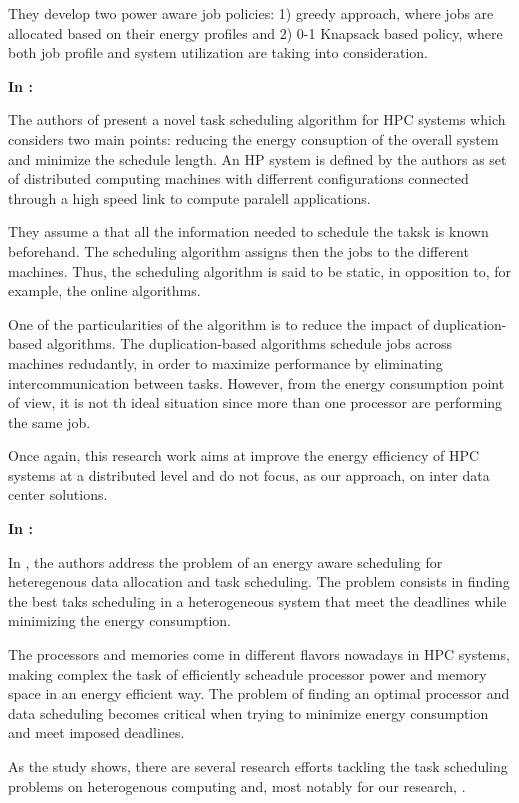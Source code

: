 They develop two power aware job policies: 1) greedy approach, where jobs are
allocated based on their energy profiles  and 2) 0-1 Knapsack based policy,
where both job profile and system utilization are taking into consideration.



\textbf{In \cite{SCHED_HETEROGE}:}

The authors of \cite{SCHED_HETEROGE} present a novel task scheduling algorithm
for HPC systems which considers two main points: reducing the energy consuption
of the overall system and minimize the schedule length. An HP system is defined
by the authors as set of distributed computing machines with differrent
configurations connected through a high speed link to compute paralell
applications.

They assume a that all the information needed to schedule the taksk is known
beforehand. The scheduling algorithm assigns then the jobs to the different
machines. Thus, the scheduling algorithm is said to be static, in opposition to,
for example, the online algorithms. 

One of the particularities of the algorithm is to reduce the impact of
duplication-based algorithms. The duplication-based algorithms schedule jobs
across machines redudantly, in order to maximize performance by eliminating
intercommunication between tasks. However, from the energy consumption point of
view, it is not th ideal situation since more than one processor are performing
the same job.

Once again, this research work aims at improve the energy efficiency of HPC
systems at a distributed level and do not focus, as our approach, on inter data
center solutions.

 
\textbf{In \cite{TASK_SCHED}:}

In \cite{TASK_SCHED}, the authors address the problem of an energy aware
scheduling for heteregenous data allocation and task scheduling. The problem
consists in finding the best taks scheduling in a heterogeneous system that meet
the deadlines while minimizing the energy consumption.

The processors and memories come in different flavors nowadays in HPC
systems, making complex the task of efficiently scheadule processor power and 
memory space in an energy efficient way. The problem of finding an optimal
processor and data scheduling becomes critical when trying to minimize energy 
consumption and meet imposed deadlines.

As the study shows, there are several research efforts tackling the task
scheduling problems on heterogenous computing and, most notably for our
research, \cite{EFF_DSP}.

